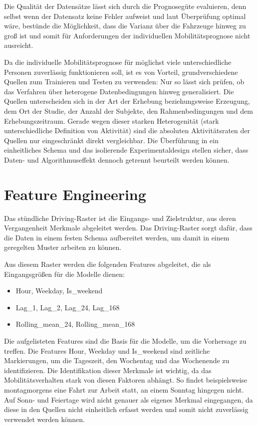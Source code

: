 Die Qualität der Datensätze lässt sich durch die Prognosegüte evaluieren, denn selbst wenn der Datensatz keine Fehler aufweist und laut Überprüfung optimal wäre, bestünde die Möglichkeit, dass die Varianz über die Fahrzeuge hinweg zu groß ist und somit für Anforderungen der individuellen Mobilitätsprognose nicht ausreicht.

Da die individuelle Mobilitätsprognose für möglichst viele unterschiedliche Personen zuverlässig funktionieren soll, ist es von Vorteil, grundverschiedene Quellen zum Trainieren und Testen zu verwenden: Nur so lässt sich prüfen, ob das Verfahren über heterogene Datenbedingungen hinweg generalisiert. Die Quellen unterscheiden sich in der Art der Erhebung beziehungsweise Erzeugung, dem Ort der Studie, der Anzahl der Subjekte, den Rahmenbedingungen und dem Erhebungszeitraum. Gerade wegen dieser starken Heterogenität (stark unterschiedliche Definition von Aktivität) sind die absoluten Aktivitätsraten der Quellen nur eingeschränkt direkt vergleichbar. Die Überführung in ein einheitliches Schema und das isolierende Experimentaldesign stellen sicher, dass Daten- und Algorithmuseffekt dennoch getrennt beurteilt werden können.


\section{Feature Engineering}
\label{sec:feature}
Das stündliche Driving-Raster ist die Eingangs- und Zielstruktur, aus deren Vergangenheit Merkmale abgeleitet werden. Das Driving-Raster sorgt dafür, dass die Daten in einem festen Schema aufbereitet werden, um damit in einem geregelten Muster arbeiten zu können.

Aus diesem Raster werden die folgenden Features abgeleitet, die als Eingangsgrößen für die Modelle dienen:
\begin{itemize}
  \item Hour, Weekday, Is\_weekend
  \item Lag\_1, Lag\_2, Lag\_24, Lag\_168
  \item Rolling\_mean\_24, Rolling\_mean\_168
\end{itemize}

Die aufgelisteten Features sind die Basis für die Modelle, um die Vorhersage zu treffen. Die Features Hour, Weekday und Is\_weekend sind zeitliche Markierungen, um die Tageszeit, den Wochentag und das Wochenende zu identifizieren. Die Identifikation dieser Merkmale ist wichtig, da das Mobilitätsverhalten stark von diesen Faktoren abhängt. So findet beispielsweise montagmorgens eine Fahrt zur Arbeit statt, an einem Sonntag hingegen nicht. Auf Sonn- und Feiertage wird nicht genauer als eigenes Merkmal eingegangen, da diese in den Quellen nicht einheitlich erfasst werden und somit nicht zuverlässig verwendet werden können.

